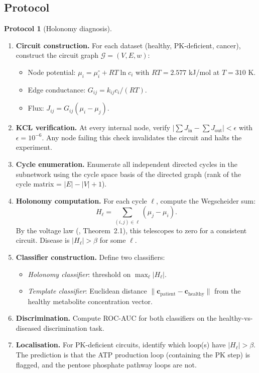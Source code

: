 \documentclass[11pt,a4paper]{article}
\theoremstyle{expthm}
\theoremstyle{definition}
\newtheorem{protocol}[theorem]{Protocol}
\theoremstyle{remark}
\newcommand{\flo}{\beta}
\newcommand{\HolL}{H_\ell}
\newcommand{\Gcond}{\mathcal{G}}
\newcommand{\abs}[1]{\lvert#1\rvert}
\newcommand{\norm}[1]{\lVert#1\rVert}
\begin{document}
\subsection{Protocol}

\begin{protocol}[Holonomy diagnosis]
\label{prot:holonomy}
\leavevmode
\begin{enumerate}[leftmargin=1.4em,itemsep=3pt]
\item \textbf{Circuit construction.} For each dataset (healthy, PK-deficient,
  cancer), construct the circuit graph $\Gcond = (V, E, w)$:
  \begin{itemize}[leftmargin=1.2em,itemsep=1pt]
  \item Node potential: $\mu_i = \mu_i^\circ + RT \ln c_i$ with
    $RT = 2.577$ kJ/mol at $T = 310$ K.
  \item Edge conductance: $G_{ij} = k_{ij} c_i / (RT)$.
  \item Flux: $J_{ij} = G_{ij}(\mu_i - \mu_j)$.
  \end{itemize}
\item \textbf{KCL verification.} At every internal node, verify
  $\abs{\sum J_{\mathrm{in}} - \sum J_{\mathrm{out}}} < \epsilon$ with
  $\epsilon = 10^{-6}$. Any node failing this check invalidates the
  circuit and halts the experiment.
\item \textbf{Cycle enumeration.} Enumerate all independent directed
  cycles in the subnetwork using the cycle space basis of the directed
  graph (rank of the cycle matrix = $\abs{E} - \abs{V} + 1$).
\item \textbf{Holonomy computation.} For each cycle $\ell$, compute the
  Wegscheider sum:
  \begin{equation}
  \HolL = \sum_{(i,j) \in \ell} (\mu_j - \mu_i).
  \label{eq:holonomy-sum}
  \end{equation}
  By the voltage law (\citep{sachikonye2026ckg}, Theorem~2.1), this
  telescopes to zero for a consistent circuit. Disease is
  $\abs{\HolL} > \flo$ for some $\ell$.
\item \textbf{Classifier construction.} Define two classifiers:
  \begin{itemize}[leftmargin=1.2em,itemsep=1pt]
  \item \emph{Holonomy classifier}: threshold on
    $\max_\ell \abs{\HolL}$.
  \item \emph{Template classifier}: Euclidean distance
    $\norm{\mathbf{c}_{\mathrm{patient}} -
    \mathbf{c}_{\mathrm{healthy}}}$ from the healthy metabolite
    concentration vector.
  \end{itemize}
\item \textbf{Discrimination.} Compute ROC-AUC for both classifiers on
  the healthy-vs-diseased discrimination task.
\item \textbf{Localisation.} For PK-deficient circuits, identify which
  loop(s) have $\abs{\HolL} > \flo$. The prediction is that the ATP
  production loop (containing the PK step) is flagged, and the pentose
  phosphate pathway loops are not.
\end{enumerate}
\end{protocol}
\end{document}
